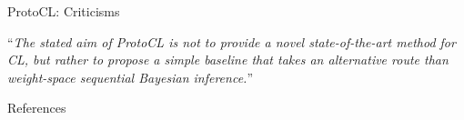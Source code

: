 \documentclass[12pt,aspectratio=169, handout]{beamer}
\let\olditem\item
\renewcommand\item{\olditem\justifying}
\begin{document}
\begin{frame}{ProtoCL: Criticisms}

    ``\textit{The stated aim of ProtoCL is not to provide a novel state-of-the-art method for CL, but rather to propose a simple baseline that takes an alternative route than weight-space sequential Bayesian inference.}''
    
\end{frame}


\begin{frame}[allowframebreaks]{References}
    \printbibliography
    
\end{frame}
\end{document}
